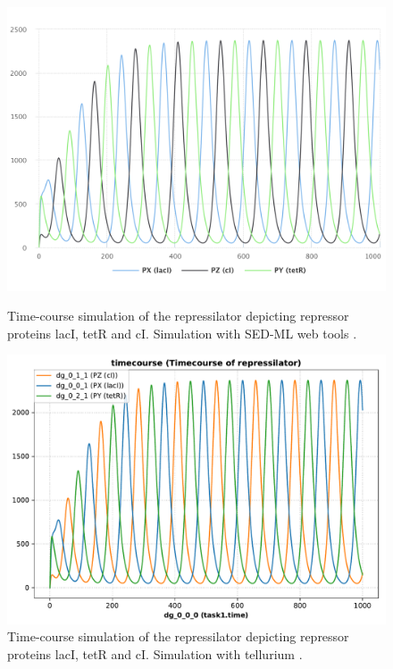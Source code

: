 \begin{figure}[ht]
    \centering
    \begin{minipage}{0.47\textwidth}
        \centering
        \includegraphics[width=1.0\textwidth]{examples/repressilator/results/sedml_webtools/timecourse}
        \caption{Time-course simulation of the repressilator depicting repressor proteins lacI, tetR and cI. Simulation with SED-ML web tools \citep{bergmann2017sed}.}
        \label{fig:rep_tc1}
    \end{minipage}\hfill
    \begin{minipage}{0.47\textwidth}
        \centering
        \includegraphics[width=1.0\textwidth]{examples/repressilator/results/tellurium/timecourse}
        \caption{Time-course simulation of the repressilator depicting repressor proteins lacI, tetR and cI. Simulation with tellurium \citep{tellurium}.}
        \label{fig:rep_tc2}
    \end{minipage}
\end{figure}


